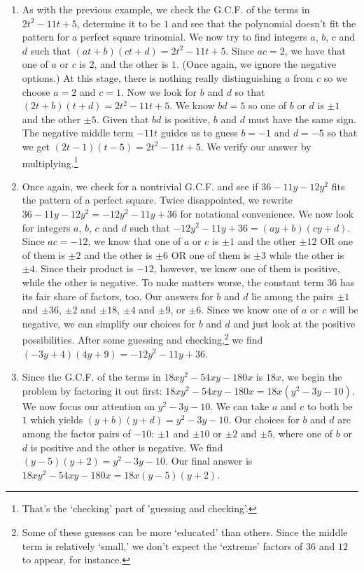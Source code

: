 \documentclass{ximera}
\begin{document}
\begin{example}
\begin{explanation}
\begin{enumerate}
\item As with the previous example, we check the G.C.F. of the terms in $2t^2 - 11t + 5$, determine it to be $1$ and see that the polynomial doesn't fit the pattern for a perfect square trinomial.  We now try to find integers $a$, $b$, $c$ and $d$ such that $(at+b)(ct+d) = 2t^2 - 11t + 5$.  Since $ac = 2$, we have that one of $a$ or $c$ is $2$, and the other is $1$. (Once again, we ignore the negative options.)  At this stage, there is nothing really distinguishing $a$ from $c$ so we choose $a = 2$ and $c = 1$.  Now we look for $b$ and $d$ so that $(2t + b)(t+d) = 2t^2 - 11t + 5$.  We know $bd = 5$ so one of $b$ or $d$ is $\pm 1$ and the other $\pm 5$. Given that $bd$ is positive, $b$ and $d$ must have the same sign.  The negative middle term $-11t$ guides us to guess $b = -1$ and $d = -5$ so that we get $(2t -1)(t -5) = 2t^2 - 11t + 5$.  We verify our answer by multiplying.\footnote{That's the `checking' part of 'guessing and checking'.}

\item  Once again, we check for a nontrivial G.C.F. and see if $36 - 11y - 12y^2$ fits the pattern of a perfect square.  Twice disappointed, we rewrite $36 - 11y - 12y^2 = -12y^2 - 11y + 36$ for notational convenience.  We now look for integers $a$, $b$, $c$ and $d$ such that $-12y^2 - 11y + 36 = (ay + b)(cy + d)$.  Since $ac =-12$, we know that one of $a$ or $c$ is $\pm 1$ and the other $\pm 12$ OR one of them is $\pm 2$ and the other is $\pm 6$ OR one of them is $\pm 3$ while the other is $\pm 4$. Since their product is $-12$, however, we know one of them is positive, while the other is negative.   To make matters worse, the constant term $36$ has its fair share of factors, too.  Our answers for $b$ and $d$ lie among the pairs $\pm 1$ and $\pm 36$, $\pm 2$ and $\pm 18$, $\pm 4$ and $\pm 9$, or $\pm 6$.  Since we know one of $a$ or $c$ will be negative, we can simplify our choices for $b$ and $d$ and just look at the positive possibilities.  After some guessing and checking,\footnote{Some of these guesses can be more `educated' than others.  Since the middle term is relatively `small,' we don't expect the `extreme' factors of $36$ and $12$ to appear, for instance.} we find $(-3y + 4)(4y+9) = -12y^2 - 11y + 36$.

\item  Since the G.C.F. of the terms in $18xy^2 - 54xy - 180x$  is $18x$, we begin the problem by factoring it out first:  $18xy^2 - 54xy - 180x = 18x(y^2 - 3y - 10)$.  We now focus our attention on $y^2 - 3y - 10$.  We can take $a$ and $c$ to both be $1$ which yields $(y+b)(y+d) = y^2 - 3y - 10$.  Our choices for $b$ and $d$ are among the factor pairs of $-10$: $\pm 1$ and $\pm 10$ or $\pm 2$ and $\pm 5$, where one of $b$ or $d$ is positive and the other is negative.  We find $(y-5)(y+2) = y^2 - 3y - 10$.  Our final answer is $18xy^2 - 54xy - 180x = 18x(y-5)(y+2)$.


\end{enumerate}
\end{explanation}
\end{example}
\end{document}
